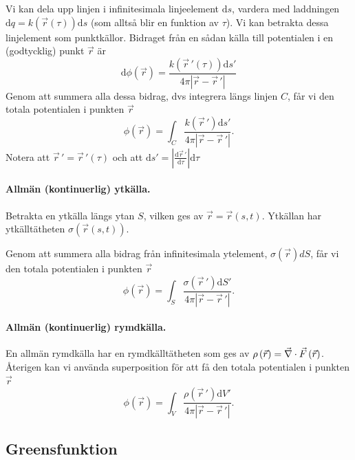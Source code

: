 \documentclass[%
oneside,                 %
final,                   %
10pt]{article}
\begin{document}
Vi kan dela upp linjen i infinitesimala linjeelement $\mbox{d}s$, vardera med laddningen $\mbox{d}q = k\left(\vec{r}(\tau)\right) \mbox{d}s$ (som alltså blir en funktion av $\tau$). Vi kan betrakta dessa linjelement som punktkällor. Bidraget från en sådan källa till potentialen i en (godtycklig) punkt $\vec{r}$ är
\begin{equation}
\mbox{d}\phi(\vec{r}) = \frac{k\left(\vec{r}\,'(\tau)\right) \mbox{d}s'}{4 \pi \left| \vec{r} - \vec{r}\,' \right|}
\end{equation}
Genom att summera alla dessa bidrag, dvs integrera längs linjen $C$, får vi den totala potentialen i punkten $\vec{r}$
\begin{equation}
\phi(\vec{r}) = \int_C \frac{k\left(\vec{r}\,'\right) \mbox{d}s'}{4 \pi \left| \vec{r} - \vec{r}\,' \right|}.
\end{equation}
Notera att $\vec{r}\,' = \vec{r}\,'(\tau)$ och att $\mbox{d}s' = \left| \frac{\mbox{d}\vec{r}\,'}{\mbox{d}\tau} \right| \mbox{d}\tau$

\paragraph{Allmän (kontinuerlig) ytkälla.}
Betrakta en ytkälla längs ytan $S$, vilken ges av $\vec{r} = \vec{r}(s,t)$. Ytkällan har ytkälltätheten $\sigma\left( \vec{r}(s,t) \right)$.

Genom att summera alla bidrag från infinitesimala ytelement, $\sigma(\vec{r})dS$, får vi den totala potentialen i punkten $\vec{r}$
\begin{equation}
\phi(\vec{r}) = \int_S \frac{\sigma\left(\vec{r}\,'\right) \mbox{d}S'}{4 \pi \left| \vec{r} - \vec{r}\,' \right|}.
\end{equation}

\paragraph{Allmän (kontinuerlig) rymdkälla.}
En allmän rymdkälla har en rymdkälltätheten som ges av $\rho\left( \vec{r} \right) = \vec{\nabla} \cdot \vec{F} \left( \vec{r} \right)$. Återigen kan vi använda superposition för att få den totala potentialen i punkten $\vec{r}$
\begin{equation}
\phi(\vec{r}) = \int_V \frac{\rho\left(\vec{r}\,'\right) \mbox{d}V'}{4 \pi \left| \vec{r} - \vec{r}\,' \right|}.
\end{equation}

\subsection*{Greensfunktion}
\end{document}

